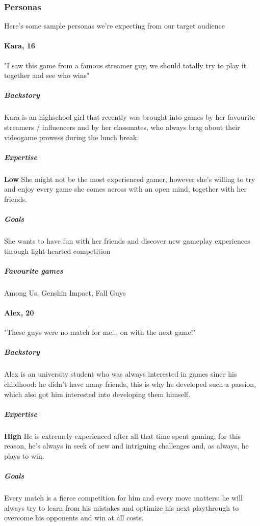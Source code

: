\subsubsection{Personas}
Here's some sample personas we're expecting from our target audience 

\paragraph{Kara, 16}


"I saw this game from a famous streamer guy, we should totally try to play it together and see who wins"

\subparagraph{Backstory}
Kara is an highschool girl that recently was brought into games by her favourite streamers / influencers and by her classmates, who always brag about their videogame prowess during the lunch break.

\subparagraph{Expertise}
\textbf{Low} She might not be the most experienced gamer, however she's willing to try and enjoy every game she comes across with an open mind, together with her friends.

\subparagraph{Goals}
She wants to have fun with her friends and discover new gameplay experiences through light-hearted competition

\subparagraph{Favourite games}
Among Us, Genshin Impact, Fall Guys

\paragraph{Alex, 20} 


"These guys were no match for me... on with the next game!"

\subparagraph{Backstory}
Alex is an university student who was always interested in games since his childhood: he didn't have many friends, this is why he developed such a passion, which also got him interested into developing them himself.

\subparagraph{Expertise}
\textbf{High} He is extremely experienced after all that time spent gaming: for this reason, he's always in seek of new and intriguing challenges and, as always, he plays to win.

\subparagraph{Goals}
Every match is a fierce competition for him and every move matters: he will always try to learn from his mistakes and optimize his next playthrough to overcome his opponents and win at all costs.

